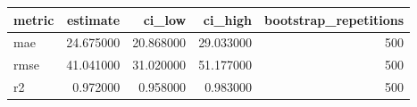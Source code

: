 \begin{tabular}{lrrrr}
\toprule
metric & estimate & ci\_low & ci\_high & bootstrap\_repetitions \\
\midrule
mae & 24.675000 & 20.868000 & 29.033000 & 500 \\
rmse & 41.041000 & 31.020000 & 51.177000 & 500 \\
r2 & 0.972000 & 0.958000 & 0.983000 & 500 \\
\bottomrule
\end{tabular}
